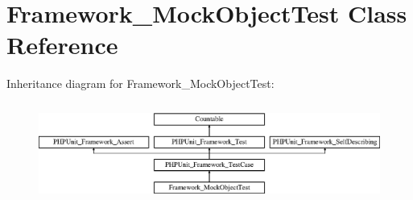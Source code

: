 \hypertarget{class_framework___mock_object_test}{}\section{Framework\+\_\+\+Mock\+Object\+Test Class Reference}
\label{class_framework___mock_object_test}
Inheritance diagram for Framework\+\_\+\+Mock\+Object\+Test\+:\begin{figure}[H]
\begin{center}
\leavevmode
\includegraphics[height=3.303835cm]{class_framework___mock_object_test}
\end{center}
\end{figure}
